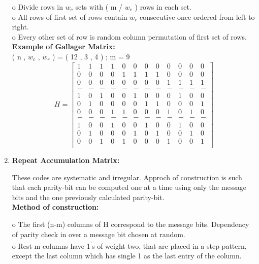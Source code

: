 \documentclass[twopage,12pt,a4paper]{report}
\begin{document}
\begin{raggedright}
\begin{enumerate}
o Divide rows in $w_c$ sets with ( m / $w_c$ ) rows in each set.  \\
o All rows of first set of rows contain $w_r$ consecutive once ordered from left to right. \\
o Every other set of row is random column permutation of first set of rows. \\
\textbf{Example of Gallager Matrix:} \\
( n , $w_c$ , $w_r$ ) = ( 12 , 3 , 4 ) ; m = 9 
\[
 H=
 \left[ \begin{array}{cccccccccccc}
1 &  1 &  1  & 1 &  0 & 0 & 0 & 0 & 0 & 0 & 0 & 0 \\
0 & 0 & 0 & 0 & 1 &  1 &  1  & 1 & 0 & 0 & 0 & 0 \\
0 & 0 & 0 & 0 & 0 & 0 & 0 & 0 & 1 &  1 &  1  & 1 \\
-& - & - & - & - & - & - & - & - &  - &  -  & -\\ 
1 &  0 &  1  & 0 &  0 & 1 & 0 & 0 & 0 & 1 & 0 & 0 \\
0 & 1 & 0 & 0 & 0 &  0 &  1  & 1 & 0 & 0 & 0 & 1 \\
0 & 0 & 0 & 1 & 1 & 0 & 0 & 0 & 1 &  0 &  1  &  0\\
-& - & - & - & - & - & - & - & - &  - &  -  & -\\ 
1 & 0 & 0 & 1 & 0 & 0 & 1 & 0 & 0 & 1 & 0 & 0 \\
0 & 1 & 0 & 0 & 0 & 1 & 0 & 1 & 0 & 0 & 1 & 0 \\
0 & 0 & 1 & 0 & 1 & 0 & 0 & 0 & 1 & 0 & 0 & 1 \\ \end{array} \right]  
\]

\item \textbf{Repeat Accumulation Matrix: }

These codes are systematic and irregular. 
Approch of construction is such that each parity-bit can be computed  one  at  a  time  using  only  the  message  bits  and  the  one  previously calculated parity-bit. \\
\textbf{Method of construction:}

o The first (n-m) columns of H correspond to the message bits. Dependency of parity check in over a message bit chosen at random. \\ 
o Rest m columns have  1\textsuperscript{'}s of weight two, that are placed in a step pattern, except the last column which has single 1 as the last entry of the column. \\



\end{enumerate}
\end{raggedright}
\end{document}
